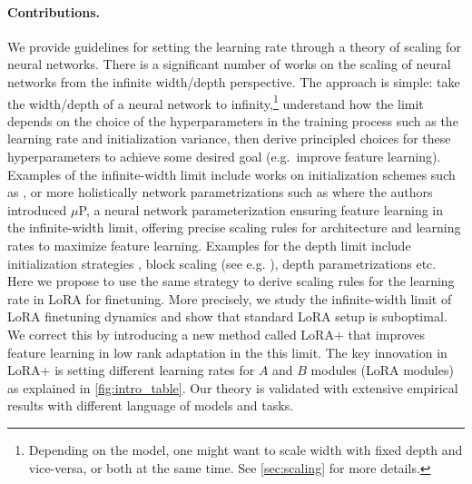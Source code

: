 \paragraph{Contributions.} We provide guidelines for setting the learning rate through a theory of scaling for neural networks. There is a significant number of works on the scaling of neural networks from the infinite width/depth perspective. The approach is simple: take the width/depth of a neural network to infinity,\footnote{Depending on the model, one might want to scale width with fixed depth and vice-versa, or both at the same time. See \cref{sec:scaling} for more details.} understand how the limit depends on the choice of the hyperparameters in the training process such as the learning rate and initialization variance, then derive principled choices for these hyperparameters to achieve some desired goal (e.g.\ improve feature learning). Examples of the infinite-width limit include works on initialization schemes such as \cite{he2016deep,yang2019scaling}, or more holistically network parametrizations such as \citep{yang2021tensor} where the authors introduced $\mu$P, a neural network parameterization ensuring feature learning in the infinite-width limit, offering precise scaling rules for architecture and learning rates to maximize feature learning. Examples for the depth limit include initialization strategies \citep{schoenholz2017deep, he2023deep, hayou19activation}, block scaling (see e.g. \cite{pmlr-v130-hayou21a,hayou2023on, noci2023shaped}), depth parametrizations \citep{yang2023depth,bordelon2023depthwise} etc. Here we propose to use the same strategy to derive scaling rules for the learning rate in LoRA for finetuning. More precisely, we study the infinite-width limit of LoRA finetuning dynamics and show that standard LoRA setup is suboptimal. We correct this by introducing a new method called LoRA$+$ that improves feature learning in low rank adaptation in the this limit. The key innovation in LoRA$+$ is setting different learning rates for $A$ and $B$ modules (LoRA modules) as explained in \cref{fig:intro_table}. Our theory is validated with extensive empirical results with different language of models and tasks.
